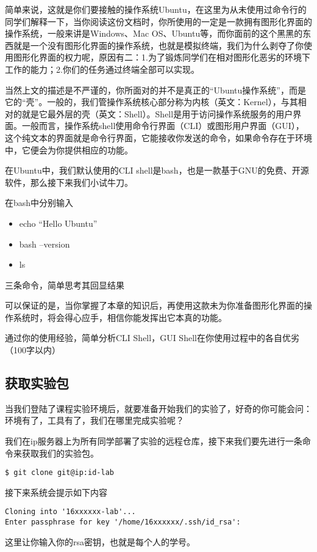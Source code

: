 简单来说，这就是你们要接触的操作系统Ubuntu，在这里为从未使用过命令行的同学们解释一下，当你阅读这份文档时，你所使用的一定是一款拥有图形化界面的操作系统，一般来讲是Windows、Mac OS、Ubuntu等，而你面前的这个黑黑的东西就是一个没有图形化界面的操作系统，也就是模拟终端，我们为什么剥夺了你使用图形化界面的权力呢，原因有二：1.为了锻炼同学们在相对图形化恶劣的环境下工作的能力；2.你们的任务通过终端全部可以实现。

当然上文的描述是不严谨的，你所面对的并不是真正的“Ubuntu操作系统”，而是它的“壳”。一般的，我们管操作系统核心部分称为内核（英文：Kernel），与其相对的就是它最外层的壳（英文：Shell）。Shell是用于访问操作系统服务的用户界面。一般而言，操作系统shell使用命令行界面（CLI）或图形用户界面（GUI），这个纯文本的界面就是命令行界面，它能接收你发送的命令，如果命令存在于环境中，它便会为你提供相应的功能。

在Ubuntu中，我们默认使用的CLI shell是bash，也是一款基于GNU的免费、开源软件，那么接下来我们小试牛刀。

\begin{exercise}
在bash中分别输入
  \begin{itemize}
    \item echo “Hello Ubuntu”
    \item bash --version
    \item ls
  \end{itemize}
三条命令，简单思考其回显结果
\end{exercise}

可以保证的是，当你掌握了本章的知识后，再使用这款未为你准备图形化界面的操作系统时，将会得心应手，相信你能发挥出它本真的功能。

\begin{thinking}\label{think-Shell简析}
通过你的使用经验，简单分析CLI Shell，GUI Shell在你使用过程中的各自优劣（100字以内）
\end{thinking}

\subsection{获取实验包}

当我们登陆了课程实验环境后，就要准备开始我们的实验了，好奇的你可能会问：环境有了，工具有了，我们在哪里完成实验呢？

我们在ip服务器上为所有同学部署了实验的远程仓库，接下来我们要先进行一条命令来获取我们的实验包。
\begin{verbatim}
$ git clone git@ip:id-lab
\end{verbatim}
接下来系统会提示如下内容
\begin{verbatim}
Cloning into '16xxxxxx-lab'...
Enter passphrase for key '/home/16xxxxxx/.ssh/id_rsa':
\end{verbatim}
这里让你输入你的rsa密钥，也就是每个人的学号。


